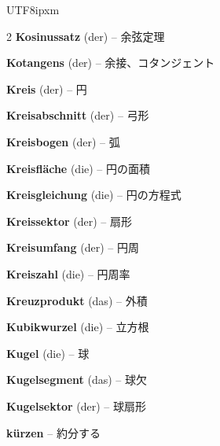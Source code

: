 \begin{CJK}{UTF8}{ipxm}
\begin{multicols}{2}
\textbf{Kosinussatz} (der) -- 余弦定理\dotfill\hyperref[e:141]{\pageref*{e:141}}\par
\textbf{Kotangens} (der) -- 余接、コタンジェント\dotfill\hyperref[e:135]{\pageref*{e:135}}\par
\textbf{Kreis} (der) -- 円\dotfill\hyperref[e:211]{\pageref*{e:211}}\par
\textbf{Kreisabschnitt} (der) -- 弓形\dotfill\hyperref[e:222]{\pageref*{e:222}}\par
\textbf{Kreisbogen} (der) -- 弧\dotfill\hyperref[e:221]{\pageref*{e:221}}\par
\textbf{Kreisfläche} (die) -- 円の面積\dotfill\hyperref[e:223]{\pageref*{e:223}}\par
\textbf{Kreisgleichung} (die) -- 円の方程式\dotfill\hyperref[e:313]{\pageref*{e:313}}\par
\textbf{Kreissektor} (der) -- 扇形\dotfill\hyperref[e:217]{\pageref*{e:217}}\par
\textbf{Kreisumfang} (der) -- 円周\dotfill\hyperref[e:215]{\pageref*{e:215}}\par
\textbf{Kreiszahl} (die) -- 円周率\dotfill\hyperref[e:216]{\pageref*{e:216}}\par
\textbf{Kreuzprodukt} (das) -- 外積\dotfill\hyperref[e:307]{\pageref*{e:307}}\par
\textbf{Kubikwurzel} (die) -- 立方根\dotfill\hyperref[e:46]{\pageref*{e:46}}\par
\textbf{Kugel} (die) -- 球\dotfill\hyperref[e:232]{\pageref*{e:232}}\par
\textbf{Kugelsegment} (das) -- 球欠\dotfill\hyperref[e:240]{\pageref*{e:240}}\par
\textbf{Kugelsektor} (der) -- 球扇形\dotfill\hyperref[e:241]{\pageref*{e:241}}\par
\textbf{kürzen} -- 約分する\dotfill\hyperref[e:37]{\pageref*{e:37}}\par


\end{multicols}
\end{CJK}
